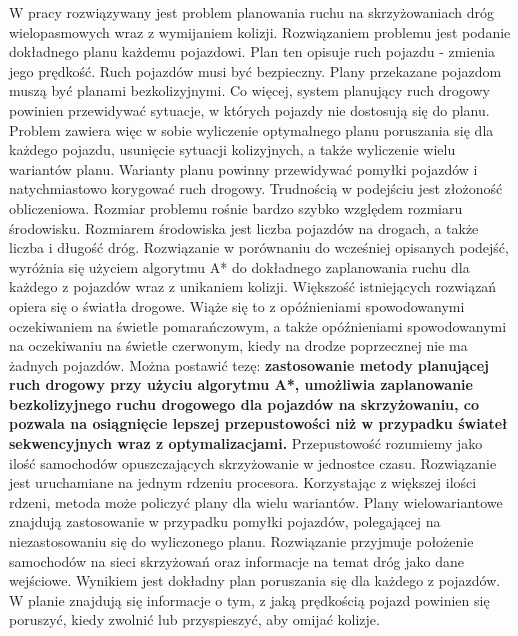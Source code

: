  \label{chap:thesis}

W pracy rozwiązywany jest problem planowania ruchu na skrzyżowaniach dróg wielopasmowych wraz z wymijaniem kolizji. Rozwiązaniem problemu jest podanie dokładnego planu każdemu pojazdowi. Plan ten opisuje ruch pojazdu - zmienia jego prędkość. Ruch pojazdów musi być bezpieczny. Plany przekazane pojazdom muszą być planami bezkolizyjnymi. Co więcej, system planujący ruch drogowy powinien przewidywać sytuacje, w których pojazdy nie dostosują się do planu. Problem zawiera więc w sobie wyliczenie optymalnego planu poruszania się dla każdego pojazdu, usunięcie sytuacji kolizyjnych, a także wyliczenie wielu wariantów planu. Warianty planu powinny przewidywać pomyłki pojazdów i natychmiastowo korygować ruch drogowy. Trudnością w podejściu jest złożoność obliczeniowa. Rozmiar problemu rośnie bardzo szybko względem rozmiaru środowisku. Rozmiarem środowiska jest liczba pojazdów na drogach, a także liczba i długość dróg.
\newline
\indent
Rozwiązanie w porównaniu do wcześniej opisanych podejść, wyróżnia się użyciem algorytmu A* do dokładnego zaplanowania ruchu dla każdego z pojazdów wraz z unikaniem kolizji. Większość istniejących rozwiązań opiera się o światła drogowe. Wiąże się to z opóźnieniami spowodowanymi oczekiwaniem na świetle pomarańczowym, a także opóźnieniami spowodowanymi na oczekiwaniu na świetle czerwonym, kiedy na drodze poprzecznej nie ma żadnych pojazdów.
\newline
\indent
Można postawić tezę: \textbf{zastosowanie metody planującej ruch drogowy przy użyciu algorytmu A*, umożliwia zaplanowanie bezkolizyjnego ruchu drogowego dla pojazdów na skrzyżowaniu, co pozwala na osiągnięcie lepszej przepustowości niż w przypadku świateł sekwencyjnych wraz z optymalizacjami.} Przepustowość rozumiemy jako ilość samochodów opuszczających skrzyżowanie w jednostce czasu. Rozwiązanie jest uruchamiane na jednym rdzeniu procesora. Korzystając z większej ilości rdzeni, metoda może policzyć plany dla wielu wariantów. Plany wielowariantowe znajdują zastosowanie w przypadku pomyłki pojazdów, polegającej na niezastosowaniu się do wyliczonego planu.
\newline
\indent
Rozwiązanie przyjmuje położenie samochodów na sieci skrzyżowań oraz informacje na temat dróg jako dane wejściowe. Wynikiem jest dokładny plan poruszania się dla każdego z pojazdów. W planie znajdują się informacje o tym, z jaką prędkością pojazd powinien się poruszyć, kiedy zwolnić lub przyspieszyć, aby omijać kolizje.
